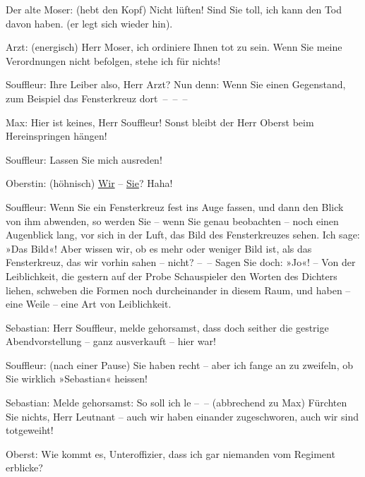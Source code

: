 \pstart
           Der alte Moser: (hebt den Kopf) Nicht lüften! Sind Sie toll, ich kann den Tod davon
               haben. (er legt sich wieder hin).\pend
           
\pstart
           Arzt: (energisch) Herr Moser, ich ordiniere Ihnen tot zu sein. Wenn Sie meine
               Verordnungen nicht befolgen, stehe ich für nichts!\pend
           
\pstart
           Souffleur: Ihre Leiber also, Herr Arzt? Nun denn: Wenn Sie einen Gegenstand, zum
               Beispiel das Fensterkreuz dort – – –\pend
           
\pstart
           Max: Hier ist keines, Herr Souffleur! Sonst bleibt der Herr Oberst beim
               Hereinspringen hängen!\pend
           
\pstart
           {\pb}Souffleur: Lassen Sie mich
               ausreden!\pend
           
\pstart
           Oberstin: (höhnisch) \uline{Wir} – \uline{Sie}? Haha!\pend
           
\pstart
           Souffleur: Wenn Sie ein Fensterkreuz fest ins Auge fassen, und dann den Blick von ihm
               abwenden, so werden Sie – wenn Sie genau beobachten – noch einen Augenblick lang, vor
               sich in der Luft, das Bild des Fensterkreuzes sehen. Ich sage: »Das Bild«! Aber
               wissen wir, ob es mehr oder weniger Bild ist, als das Fensterkreuz, das wir vorhin
               sahen – nicht? – – Sagen Sie doch: »Jo«! – Von der Leiblichkeit, die gestern auf der
               Probe Schauspieler den Worten des Dichters liehen, schweben die Formen noch
               durcheinander in diesem Raum, und haben – eine Weile – eine Art von Leiblichkeit.\pend
           
\pstart
           Sebastian: Herr Souffleur, melde gehorsamst, dass doch seither die gestrige
               Abendvorstellung – ganz ausverkauft – hier war!\pend
           
\pstart
           Souffleur: (nach einer Pause) Sie haben recht – aber ich fange an zu zweifeln, ob Sie
               wirklich »Sebastian« heissen!\pend
           
\pstart
           Sebastian: Melde gehorsamst: So soll ich le – – (abbrechend zu Max) Fürchten Sie
               nichts, Herr Leutnant – auch wir haben einander zugeschworen, auch wir sind
               totgeweiht!\pend
           
\pstart
           Oberst: Wie kommt es, Unteroffizier, dass ich gar niemanden vom Regiment
               erblicke?\pend
           
